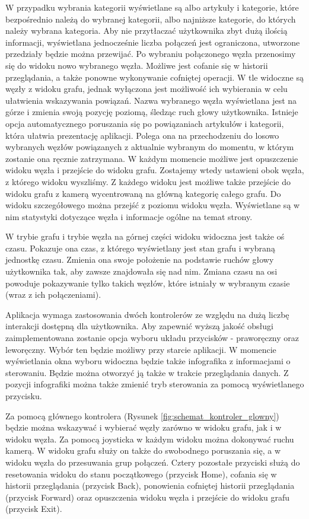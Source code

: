 W przypadku wybrania kategorii wyświetlane są albo artykuły i kategorie, które bezpośrednio należą do wybranej kategorii, albo najniższe kategorie, do których należy wybrana kategoria. Aby nie przytłaczać użytkownika zbyt dużą ilością informacji, wyświetlana jednocześnie liczba połączeń jest ograniczona, utworzone przedziały będzie można przewijać. Po wybraniu połączonego węzła przenosimy się do widoku nowo wybranego węzła. Możliwe jest cofanie się w historii przeglądania, a także ponowne wykonywanie cofniętej operacji. W tle widoczne są węzły z widoku grafu, jednak wyłączona jest możliwość ich wybierania w celu ułatwienia wskazywania powiązań. Nazwa wybranego węzła wyświetlana jest na górze i zmienia swoją pozycję poziomą, śledząc ruch głowy użytkownika. Istnieje opcja automatycznego poruszania się po powiązaniach artykułów i kategorii, która ułatwia prezentację aplikacji. Polega ona na przechodzeniu do losowo wybranych węzłów powiązanych z aktualnie wybranym do momentu, w którym zostanie ona ręcznie zatrzymana. W każdym momencie możliwe jest opuszczenie widoku węzła i przejście do widoku grafu. Zostajemy wtedy ustawieni obok węzła, z którego widoku wyszliśmy. Z każdego widoku jest możliwe także przejście do widoku grafu z kamerą wycentrowaną na główną kategorię całego grafu. Do widoku szczegółowego można przejść z poziomu widoku węzła. Wyświetlane są w nim statystyki dotyczące węzła i informacje ogólne na temat strony.

W trybie grafu i trybie węzła na górnej części widoku widoczna jest także oś czasu. Pokazuje ona czas, z którego wyświetlany jest stan grafu i wybraną jednostkę czasu. Zmienia ona swoje położenie na podstawie ruchów głowy użytkownika tak, aby zawsze znajdowała się nad nim. Zmiana czasu na osi powoduje pokazywanie tylko takich węzłów, które istniały w wybranym czasie (wraz z ich połączeniami).

Aplikacja wymaga zastosowania dwóch kontrolerów ze względu na dużą liczbę interakcji dostępną dla użytkownika. Aby zapewnić wyższą jakość obsługi zaimplementowana zostanie opcja wyboru układu przycisków - praworęczny oraz leworęczny. Wybór ten będzie możliwy przy starcie aplikacji. W momencie wyświetlania okna wyboru widoczna będzie także infografika z informacjami o sterowaniu. Będzie można  otworzyć ją także w trakcie przeglądania danych. Z pozycji infografiki można także zmienić tryb sterowania za pomocą wyświetlanego przycisku.

Za pomocą głównego kontrolera (Rysunek \ref{fig:schemat_kontroler_glowny}) będzie można wskazywać i wybierać węzły zarówno w widoku grafu, jak i w widoku węzła. Za pomocą joysticka w każdym widoku można dokonywać ruchu kamerą. W widoku grafu służy on także do swobodnego poruszania się, a w widoku węzła do przesuwania grup połączeń. Cztery pozostałe przyciski służą do resetowania widoku do stanu początkowego (przycisk Home), cofania się w historii przeglądania (przycisk Back), ponowienia cofniętej historii przeglądania (przycisk Forward) oraz opuszczenia widoku węzła i przejście do widoku grafu (przycisk Exit).

